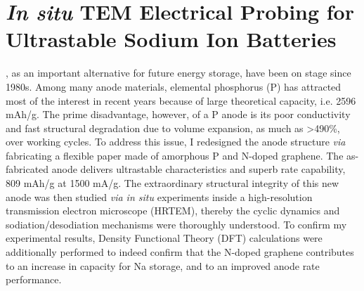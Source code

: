 

\chapter{\emph{In situ} TEM Electrical Probing for Ultrastable Sodium Ion Batteries}

, as an important alternative for future energy storage, have been on stage since 1980s. Among many anode materials, elemental phosphorus (P) has attracted most of the interest in recent years because of large theoretical capacity, i.e. 2596 mAh/g. The prime disadvantage, however, of a P anode is its poor conductivity and fast structural degradation due to volume expansion, as much as >490\%, over working cycles. To address this issue, I redesigned the anode structure \textit{via} fabricating a flexible paper made of amorphous P and N-doped graphene. The as-fabricated anode delivers ultrastable characteristics and superb rate capability, 809 mAh/g at 1500 mA/g. The extraordinary structural integrity of this new anode was then studied \textit{via in situ} experiments inside a high-resolution transmission electron microscope (HRTEM), thereby the cyclic dynamics and sodiation/desodiation mechanisms were thoroughly understood. To confirm my experimental results, Density Functional Theory (DFT) calculations were additionally performed to indeed confirm that the N-doped graphene contributes to an increase in capacity for Na storage, and to an improved anode rate performance.

